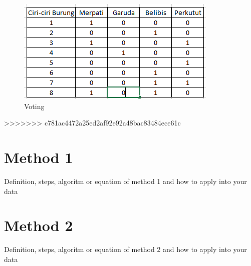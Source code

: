 \begin{enumerate}
\begin{figure}[ht]
\centering
\includegraphics[scale=0.9]{figures/RF/1_2.png}
\caption{Voting}
\end{figure}

\end{enumerate}

>>>>>>> c781ac4472a25ed2af92e92a48bac83484ece61c
\section{Method 1}
Definition, steps, algoritm or equation of method 1 and how to apply into your data
\section{Method 2}
Definition, steps, algoritm or equation of method 2 and how to apply into your data